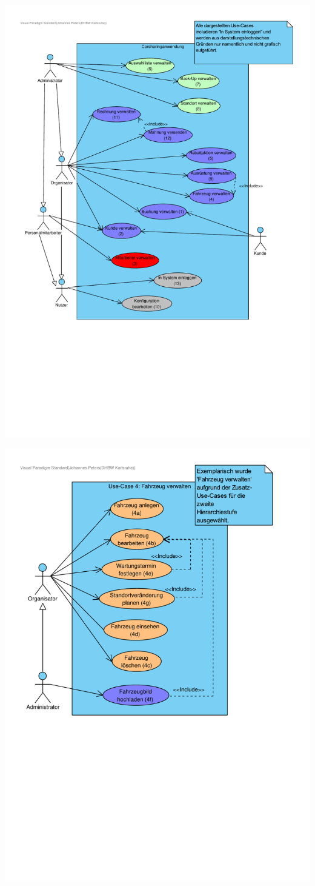 \includegraphics[width=\textwidth, height=\textheight - 1.5 cm]{Bilder/Diagramme/Use-Case Diagramm.pdf}

\newpage

\includegraphics[width=\textwidth, height=\textheight]{Bilder/Diagramme/Use Case 4_ Fahrzeug verwalten.pdf}